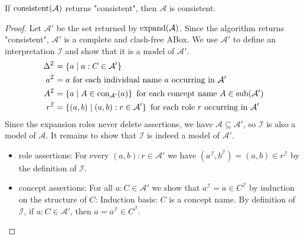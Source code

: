 \begin{lemma}[Soundness]
	If $\operatorname{\text{consistent}}(\mathcal{A})$ returns "consistent", then $\mathcal{A}$ is consistent.
\end{lemma}
\begin{proof}
	Let $\mathcal{A}'$ be the set returned by $\operatorname{\text{expand}}(\mathcal{A})$.
	Since the algorithm returns "consistent", $\mathcal{A}'$ is a complete and clash-free ABox.
	We use $\mathcal{A}'$ to define an interpretation $\mathcal{I}$ and show that it is a model of $\mathcal{A}'$.
	\begin{align*}
		\Delta^\mathcal{I} &= \left\{ a \mid a:C \in \mathcal{A}' \right\}\\
		a^\mathcal{I} &= a \text{ for each individual name $a$ occurring in $\mathcal{A}'$} \\
		A^\mathcal{I} &= \left\{ a \mid A \in \operatorname{\text{con}}_{\mathcal{A}'}(a) \right\} \text{ for each concept name } A \in \operatorname{\text{sub}}(\mathcal{A'}) \\
		r^\mathcal{I} &= \left\{ (a,b) \mid (a,b):r \in \mathcal{A}' \right\} \text{ for each role $r$ occurring in $\mathcal{A}'$}
	\end{align*}
	Since the expansion roles never delete assertions, we have $\mathcal{A} \subseteq \mathcal{A}'$, so $\mathcal{I}$ is also a model of $\mathcal{A}$.
	It remains to show that $\mathcal{I}$ is indeed a model of $\mathcal{A}'$.
	\begin{itemize}
		\item role assertions: For every $(a,b) : r \in \mathcal{A}'$ we have $(a^\mathcal{I},b^\mathcal{I}) = (a,b) \in r^\mathcal{I}$ by the definition of $\mathcal{I}$.
		\item concept assertions: For all $a : C \in \mathcal{A}'$ we show that $a^\mathcal{I} = a \in C^\mathcal{I}$ by induction on the structure of $C$:
			Induction basis: $C$ is a concept name.
			By definition of $\mathcal{I}$, if $a : C \in \mathcal{A}'$, then $a = a^\mathcal{I} \in C^\mathcal{I}$.


\end{itemize}
\end{proof}
